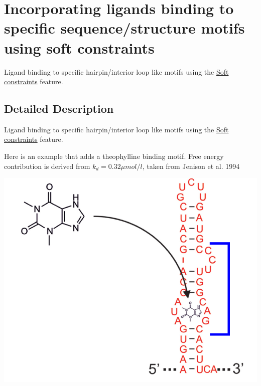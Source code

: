 \hypertarget{group__constraints__ligand}{}\section{Incorporating ligands binding to specific sequence/structure motifs using soft constraints}
\label{group__constraints__ligand}


Ligand binding to specific hairpin/interior loop like motifs using the \hyperlink{group__soft__constraints}{Soft constraints} feature.  




\subsection{Detailed Description}
Ligand binding to specific hairpin/interior loop like motifs using the \hyperlink{group__soft__constraints}{Soft constraints} feature. 

Here is an example that adds a theophylline binding motif. Free energy contribution is derived from $k_d = 0.32 \mu mol / l $, taken from Jenison et al. 1994

 
\begin{DoxyImageNoCaption}
  \mbox{\includegraphics[width=\textwidth,height=\textheight/2,keepaspectratio=true]{theo_aptamer}}
\end{DoxyImageNoCaption}



